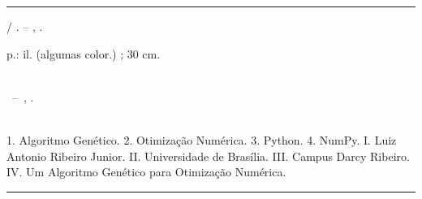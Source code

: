 \begin{fichacatalografica}
  \vspace*{\fill}                   %
  \hrule                            %
  \begin{center}                    %
    \begin{minipage}[c]{12.5cm}     %
      
      \imprimirautor
      
      \hspace{0.5cm} \imprimirtitulo  / \imprimirautor. --
      \imprimirlocal, \imprimirdata.
      
      \hspace{0.5cm} \pageref{LastPage} p.: il. (algumas color.) ; 30 cm.\\
      
      \hspace{0.5cm} \imprimirorientadorRotulo~\imprimirorientador\\
      
      \hspace{0.5cm}
      \parbox[t]{\textwidth}{\imprimirtipotrabalho~--~\imprimirinstituicao,
        \imprimirdata.}\\
      
      \hspace{0.5cm}
      1. Algoritmo Genético.
      2. Otimização Numérica.
      3. Python.
      4. NumPy.
      I. Luiz Antonio Ribeiro Junior.
      II. Universidade de Brasília.
      III. Campus Darcy Ribeiro.
      IV. Um Algoritmo Genético para Otimização Numérica.\\
      
      
    \end{minipage}
  \end{center}
  \hrule
\end{fichacatalografica}